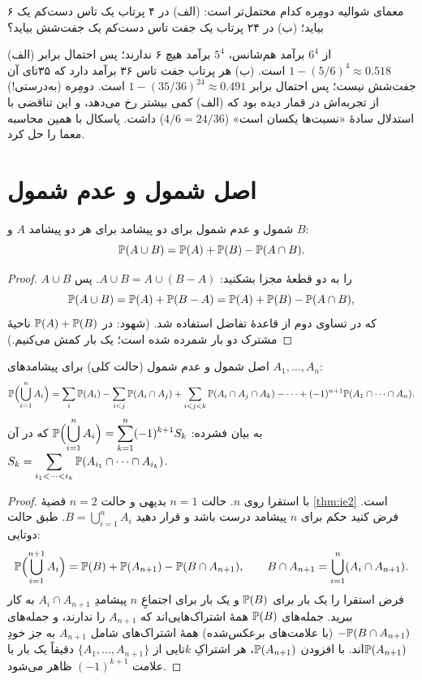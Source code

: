 \begin{example}{معمای شوالیه دومِره}
کدام محتمل‌تر است: (الف) در ۴ پرتاب یک تاس دست‌کم یک ۶ بیاید؛ (ب) در ۲۴ پرتاب یک جفت تاس دست‌کم یک جفت‌شش بیاید؟
\begin{solution}
(الف) از $6^4$ برآمد هم‌شانس، $5^4$ برآمد هیچ ۶ ندارند؛ پس احتمال برابر $1-(5/6)^4\approx0.518$ است.
(ب) هر پرتاب جفت تاس ۳۶ برآمد دارد که ۳۵تای آن جفت‌شش نیست؛ پس احتمال برابر $1-(35/36)^{24}\approx0.491$ است.
دومِره (به‌درستی!) از تجربه‌اش در قمار دیده بود که (الف) کمی بیشتر رخ می‌دهد، و این تناقضی با استدلال سادهٔ «نسبت‌ها یکسان است» ($4/6=24/36$) داشت. پاسکال با همین محاسبه معما را حل کرد.
\end{solution}
\end{example}

\section{اصل شمول و عدم شمول}


\begin{theorem}[label=thm:ie2]{شمول و عدم شمول برای دو پیشامد}
برای هر دو پیشامد $A$ و $B$:
\[ \P(A\cup B)=\P(A)+\P(B)-\P(A\cap B). \]
\end{theorem}

\begin{proof}
$A\cup B$ را به دو قطعهٔ مجزا بشکنید: $A\cup B=A\cup(B-A)$. پس
\[ \P(A\cup B)=\P(A)+\P(B-A)=\P(A)+\P(B)-\P(A\cap B), \]
که در تساوی دوم از قاعدهٔ تفاضل استفاده شد. (شهود: در $\P(A)+\P(B)$ ناحیهٔ مشترک دو بار شمرده شده است؛ یک بار کمش می‌کنیم.)
\end{proof}

\begin{theorem}[label=thm:ie-general]{اصل شمول و عدم شمول (حالت کلی)}
برای پیشامدهای $A_1,\dots,A_n$:
\[
\P\Bigl(\bigcup_{i=1}^n A_i\Bigr)=\sum_{i}\P(A_i)-\sum_{i<j}\P(A_i\cap A_j)+\sum_{i<j<k}\P(A_i\cap A_j\cap A_k)-\cdots+(-1)^{n+1}\P(A_1\cap\cdots\cap A_n).
\]
به بیان فشرده: $\displaystyle \P\Bigl(\bigcup_{i=1}^n A_i\Bigr)=\sum_{k=1}^{n}(-1)^{k+1}S_k$ که در آن $\displaystyle S_k=\sum_{i_1<\cdots<i_k}\P(A_{i_1}\cap\cdots\cap A_{i_k})$.
\end{theorem}

\begin{proof}
با استقرا روی $n$. حالت $n=1$ بدیهی و حالت $n=2$ قضیهٔ \ref{thm:ie2} است. فرض کنید حکم برای $n$ پیشامد درست باشد و قرار دهید $B=\bigcup_{i=1}^nA_i$. طبق حالت دوتایی:
\[ \P\Bigl(\bigcup_{i=1}^{n+1}A_i\Bigr)=\P(B)+\P(A_{n+1})-\P(B\cap A_{n+1}),\qquad B\cap A_{n+1}=\bigcup_{i=1}^n(A_i\cap A_{n+1}). \]
فرض استقرا را یک بار برای $\P(B)$ و یک بار برای اجتماعِ $n$ پیشامدِ $A_i\cap A_{n+1}$ به کار ببرید. جمله‌های $\P(B)$ همهٔ اشتراک‌هایی‌اند که $A_{n+1}$ را ندارند، و جمله‌های $-\P(B\cap A_{n+1})$ (با علامت‌های برعکس‌شده) همهٔ اشتراک‌های شامل $A_{n+1}$ به جز خودِ $\P(A_{n+1})$اند. با افزودن $\P(A_{n+1})$، هر اشتراکِ $k$تایی از $\{A_1,\dots,A_{n+1}\}$ دقیقاً یک بار با علامت $(-1)^{k+1}$ ظاهر می‌شود.
\end{proof}

